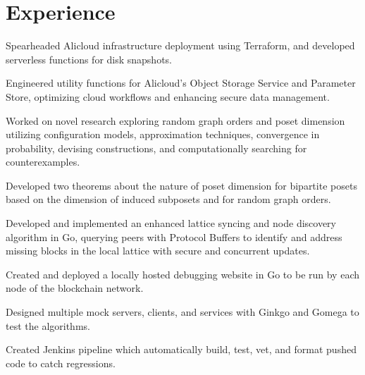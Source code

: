\section{Experience}

\begin{resumeItem}
\begin{resumeList}
    \item Spearheaded Alicloud infrastructure deployment using Terraform, and developed serverless functions for disk snapshots.
    \item Engineered utility functions for Alicloud's Object Storage Service and Parameter Store, optimizing cloud workflows and enhancing secure data management.
\end{resumeList}
\end{resumeItem}

\begin{resumeItem}
\begin{resumeList}
    \item Worked on novel research exploring random graph orders and poset dimension utilizing configuration models, approximation techniques, convergence in probability, devising constructions, and computationally searching for counterexamples. 
    \item Developed two theorems about the nature of poset dimension for bipartite posets based on the dimension of induced subposets and for random graph orders.
\end{resumeList}
\end{resumeItem}

\begin{resumeItem}
\begin{resumeList}
    \item Developed and implemented an enhanced lattice syncing and node discovery algorithm in Go, querying peers with Protocol Buffers to identify and address missing blocks in the local lattice with secure and concurrent updates.
    \item Created and deployed a locally hosted debugging website in Go to be run by each node of the blockchain network.
    \item Designed multiple mock servers, clients, and services with Ginkgo and Gomega to test the algorithms.
    \item Created Jenkins pipeline which automatically build, test, vet, and format pushed code to catch regressions.
\end{resumeList}
\end{resumeItem}

